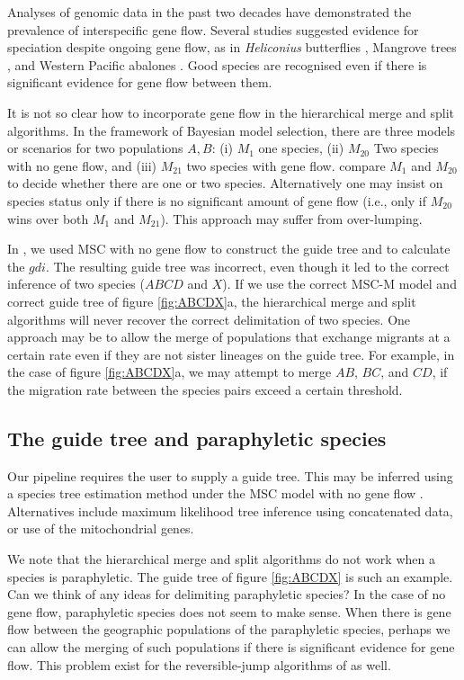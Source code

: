 \documentclass{article1}
\begin{document}
Analyses of genomic data in the past two decades have demonstrated the prevalence of
interspecific gene flow.  Several studies suggested evidence for speciation despite
ongoing gene flow, as in \textit{Heliconius} butterflies \citep{Martin2013}, Mangrove
trees \citep{He2019}, and Western Pacific abalones \citep{Hirase2021}.  Good species are
recognised even if there is significant evidence for gene flow between them.

It is not so clear how to incorporate gene flow in the hierarchical merge and split
algorithms.  In the framework of Bayesian model selection, there are three models or
scenarios for two populations $A,B$: (i) $M_1$ one species, (ii) $M_{20}$ Two species
with no gene flow, and (iii) $M_{21}$ two species with gene flow.  \citet{Leache2019}
compare $M_1$ and $M_{20}$ to decide whether there are one or two species. Alternatively
one may insist on species status only if there is no significant amount of gene flow
(i.e., only if $M_{20}$ wins over both $M_1$ and $M_{21}$).  This approach may suffer
from over-lumping.

In \citet{Leache2019}, we used MSC with no gene flow to construct the guide tree and to
calculate the $gdi$.  The resulting guide tree \citep[][figure 3b]{Leache2019} was
incorrect, even though it led to the correct inference of two species ($ABCD$ and $X$). 
If we use the correct MSC-M model and correct guide tree of figure \ref{fig:ABCDX}a, the
hierarchical merge and split algorithms will never recover the correct delimitation of
two species.  One approach may be to allow the merge of populations that exchange
migrants at a certain rate even if they are not sister lineages on the guide tree.  For
example, in the case of figure \ref{fig:ABCDX}a, we may attempt to merge $AB$, $BC$, and
$CD$, if the migration rate between the species pairs exceed a certain threshold.

\subsection{The guide tree and paraphyletic species}

Our pipeline requires the user to supply a guide tree.  This may be inferred using a
species tree estimation method under the MSC model with no gene flow \citep{Yang2014,
Rannala2017}.  Alternatives include maximum likelihood tree inference using concatenated
data, or use of the mitochondrial genes.

We note that the hierarchical merge and split algorithms do not work when a species is
paraphyletic.  The guide tree of figure \ref{fig:ABCDX} is such an example.  Can we
think of any ideas for delimiting paraphyletic species?  In the case of no gene flow,
paraphyletic species does not seem to make sense.  When there is gene flow between the
geographic populations of the paraphyletic species, perhaps we can allow the merging of
such populations if there is significant evidence for gene flow.  This problem exist for
the reversible-jump algorithms of \citet{Yang2010} as well.
\end{document}
